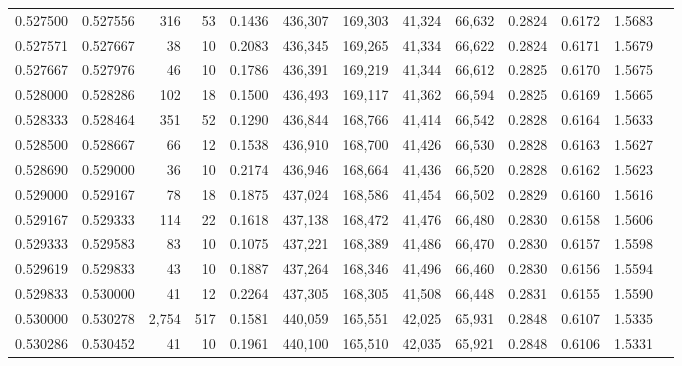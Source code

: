 \begin{tabular}{rrrrrrrrrrrrr}
0.527500 & 0.527556 &   316 &  53 &                                     0.1436 & 436,307 & 169,303 &  41,324 &  66,632 & 0.2824 & 0.6172 & 1.5683 \\
0.527571 & 0.527667 &    38 &  10 &                                     0.2083 & 436,345 & 169,265 &  41,334 &  66,622 & 0.2824 & 0.6171 & 1.5679 \\
0.527667 & 0.527976 &    46 &  10 &                                     0.1786 & 436,391 & 169,219 &  41,344 &  66,612 & 0.2825 & 0.6170 & 1.5675 \\
0.528000 & 0.528286 &   102 &  18 &                                     0.1500 & 436,493 & 169,117 &  41,362 &  66,594 & 0.2825 & 0.6169 & 1.5665 \\
0.528333 & 0.528464 &   351 &  52 &                                     0.1290 & 436,844 & 168,766 &  41,414 &  66,542 & 0.2828 & 0.6164 & 1.5633 \\
0.528500 & 0.528667 &    66 &  12 &                                     0.1538 & 436,910 & 168,700 &  41,426 &  66,530 & 0.2828 & 0.6163 & 1.5627 \\
0.528690 & 0.529000 &    36 &  10 &                                     0.2174 & 436,946 & 168,664 &  41,436 &  66,520 & 0.2828 & 0.6162 & 1.5623 \\
0.529000 & 0.529167 &    78 &  18 &                                     0.1875 & 437,024 & 168,586 &  41,454 &  66,502 & 0.2829 & 0.6160 & 1.5616 \\
0.529167 & 0.529333 &   114 &  22 &                                     0.1618 & 437,138 & 168,472 &  41,476 &  66,480 & 0.2830 & 0.6158 & 1.5606 \\
0.529333 & 0.529583 &    83 &  10 &                                     0.1075 & 437,221 & 168,389 &  41,486 &  66,470 & 0.2830 & 0.6157 & 1.5598 \\
0.529619 & 0.529833 &    43 &  10 &                                     0.1887 & 437,264 & 168,346 &  41,496 &  66,460 & 0.2830 & 0.6156 & 1.5594 \\
0.529833 & 0.530000 &    41 &  12 &                                     0.2264 & 437,305 & 168,305 &  41,508 &  66,448 & 0.2831 & 0.6155 & 1.5590 \\
0.530000 & 0.530278 & 2,754 & 517 &                                     0.1581 & 440,059 & 165,551 &  42,025 &  65,931 & 0.2848 & 0.6107 & 1.5335 \\
0.530286 & 0.530452 &    41 &  10 &                                     0.1961 & 440,100 & 165,510 &  42,035 &  65,921 & 0.2848 & 0.6106 & 1.5331 \\

\end{tabular}
